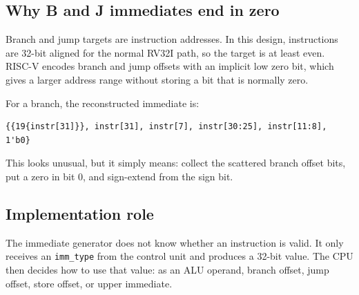 \subsection{Why B and J immediates end in zero}

Branch and jump targets are instruction addresses. In this design, instructions are 32-bit aligned for the normal RV32I path, so the target is at least even. RISC-V encodes branch and jump offsets with an implicit low zero bit, which gives a larger address range without storing a bit that is normally zero.

For a branch, the reconstructed immediate is:

\begin{lstlisting}[language={}]
{{19{instr[31]}}, instr[31], instr[7], instr[30:25], instr[11:8], 1'b0}
\end{lstlisting}

This looks unusual, but it simply means: collect the scattered branch offset bits, put a zero in bit 0, and sign-extend from the sign bit.

\subsection{Implementation role}

The immediate generator does not know whether an instruction is valid. It only receives an \texttt{imm\_type} from the control unit and produces a 32-bit value. The CPU then decides how to use that value: as an ALU operand, branch offset, jump offset, store offset, or upper immediate.

\bigskip
